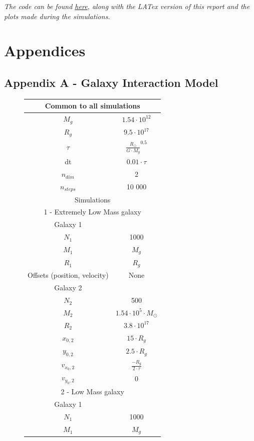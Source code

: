 \documentclass[a4paper,12pt]{article}
\begin{document}
\emph{The code can be found \hyperref{https://github.com/AlbanSMA/CompAstro2_Projec1/tree/edit1}{}{}{here}, along with the LATex version of this report and the plots made during the simulations.}

\pagebreak
\section{Appendices}
\subsection{Appendix A - Galaxy Interaction Model}
\label{sec:AppA}
\begin{figure}[ht!]
\centering
\begin{tabular}{|c|c|}
\hline
\multicolumn{2}{|c|}{Common to all simulations}\\
\hline \hline
 $M_g$ & $1.54\cdot 10^{12}$\\
 $R_g$ & $9.5\cdot10^{17}$\\
 $\tau$ & $\frac{R_\odot}{G\cdot M_g}^{0.5}$\\
 dt & $0.01\cdot\tau$\\
 $n_{dim}$ & 2\\
 $n_{steps}$ & 10 000\\
 \hline\hline
 \multicolumn{2}{|c|}{Simulations}\\
 \hline\hline
 \multicolumn{2}{|c|}{1 - Extremely Low Mass galaxy}\\
 \hline
 Galaxy 1 & \\
 $N_1$ & 1000\\
 $M_1$ & $M_g$\\
 $R_1$ & $R_g$\\
 Offsets (position, velocity) & None\\
 \hline
 Galaxy 2 & \\
 $N_2$ & 500\\
 $M_2$ & $1.54\cdot10^5\cdot M_\odot$\\
 $R_2$ & $3.8\cdot 10^{17}$\\
 $x_{0,2}$ & $15\cdot R_g$\\
 $y_{0,2}$ & $2.5\cdot R_g$\\
 $v_{x_0, 2}$ & $\frac{-R_g}{2\cdot\tau}$\\
 $v_{y_0, 2}$ & 0\\
\hline\hline
\multicolumn{2}{|c|}{2 - Low Mass galaxy}\\
\hline
 Galaxy 1 & \\
 $N_1$ & 1000\\
 $M_1$ & $M_g$\\

\end{tabular}
\end{figure}
\end{document}
